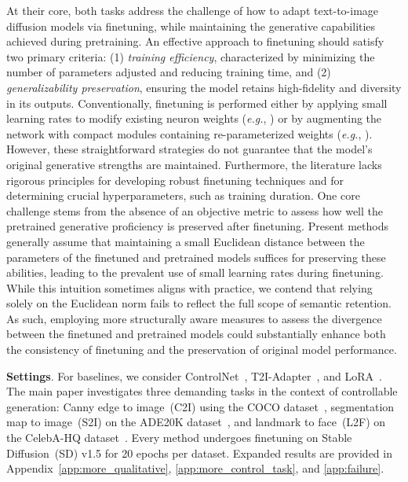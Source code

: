 \begin{itemize}[leftmargin=*,nosep]
At their core, both tasks address the challenge of how to adapt text-to-image diffusion models via finetuning, while maintaining the generative capabilities achieved during pretraining. An effective approach to finetuning should satisfy two primary criteria: (1) \emph{training efficiency}, characterized by minimizing the number of parameters adjusted and reducing training time, and (2) \emph{generalizability preservation}, ensuring the model retains high-fidelity and diversity in its outputs. Conventionally, finetuning is performed either by applying small learning rates to modify existing neuron weights (\emph{e.g.}, \cite{ruiz2023dreambooth}) or by augmenting the network with compact modules containing re-parameterized weights (\emph{e.g.}, \cite{hulora2022,zhang2023adding}). However, these straightforward strategies do not guarantee that the model's original generative strengths are maintained. Furthermore, the literature lacks rigorous principles for developing robust finetuning techniques and for determining crucial hyperparameters, such as training duration. One core challenge stems from the absence of an objective metric to assess how well the pretrained generative proficiency is preserved after finetuning. Present methods generally assume that maintaining a small Euclidean distance between the parameters of the finetuned and pretrained models suffices for preserving these abilities, leading to the prevalent use of small learning rates during finetuning. While this intuition sometimes aligns with practice, we contend that relying solely on the Euclidean norm fails to reflect the full scope of semantic retention. As such, employing more structurally aware measures to assess the divergence between the finetuned and pretrained models could substantially enhance both the consistency of finetuning and the preservation of original model performance.

\textbf{Settings}. For baselines, we consider ControlNet~\cite{zhang2023adding}, T2I-Adapter~\cite{mou2023t2i}, and LoRA~\cite{hulora2022}. The main paper investigates three demanding tasks in the context of controllable generation: Canny edge to image~(C2I) using the COCO dataset~\cite{lin2014microsoft}, segmentation map to image~(S2I) on the ADE20K dataset~\cite{zhou2017scene}, and landmark to face~(L2F) on the CelebA-HQ dataset~\cite{karras2018progressive,xia2021tedigan}. Every method undergoes finetuning on Stable Diffusion~(SD) v1.5 for 20 epochs per dataset. Expanded results are provided in Appendix~\ref{app:more_qualitative}, \ref{app:more_control_task}, and \ref{app:failure}.


\end{itemize}
